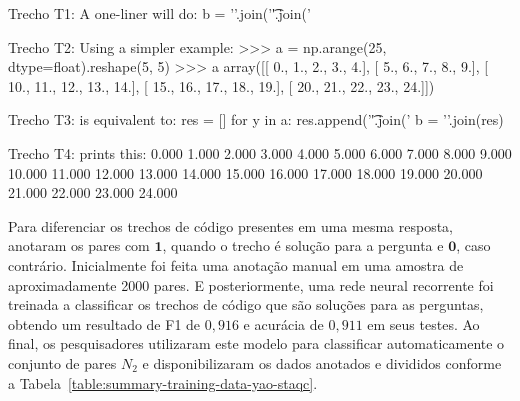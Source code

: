 \begin{tcolorbox}[colframe=orange!75!black,colback=gray!15!white,fonttitle=\bfseries,adjusted title=\large{Título da questão: convert 2d numpy array to string}~\ref{foot:exemplo-stackoverflow-mais-de-um-trecho}]
\begin{mypythongreen}{Trecho T1: A one-liner will do:}
b = '\n'.join('\t'.join('%
\end{mypythongreen}

\begin{mypythonred}{Trecho T2: Using a simpler example:}
>>> a = np.arange(25, dtype=float).reshape(5, 5)
>>> a
array([[  0.,   1.,   2.,   3.,   4.],
       [  5.,   6.,   7.,   8.,   9.],
       [ 10.,  11.,  12.,  13.,  14.],
       [ 15.,  16.,  17.,  18.,  19.],
       [ 20.,  21.,  22.,  23.,  24.]])
\end{mypythonred}
\begin{mypythongreen}{Trecho T3: is equivalent to:}
res = []
for y in a:
    res.append('\t'.join('%
b = '\n'.join(res)
\end{mypythongreen}
\begin{mypythonred}{Trecho T4: prints this:}
0.000   1.000   2.000   3.000   4.000
5.000   6.000   7.000   8.000   9.000
10.000  11.000  12.000  13.000  14.000
15.000  16.000  17.000  18.000  19.000
20.000  21.000  22.000  23.000  24.000
\end{mypythonred}
\end{tcolorbox}


Para diferenciar os trechos de código presentes em uma mesma resposta, \cite{yao-2018} anotaram os pares com $\bm{1}$, quando o trecho é solução para a pergunta e $\bm{0}$, caso contrário. Inicialmente foi feita uma anotação manual em uma amostra de aproximadamente 2000 pares. E posteriormente, uma rede neural recorrente foi treinada a classificar os trechos de código que são soluções para as perguntas, obtendo um resultado de F1 de $0,916$ e acurácia de $0,911$ em seus testes. Ao final, os pesquisadores utilizaram este modelo para classificar automaticamente o conjunto de pares $N_{2}$ e disponibilizaram os dados anotados e divididos conforme a Tabela~\ref{table:summary-training-data-yao-staqc}.

